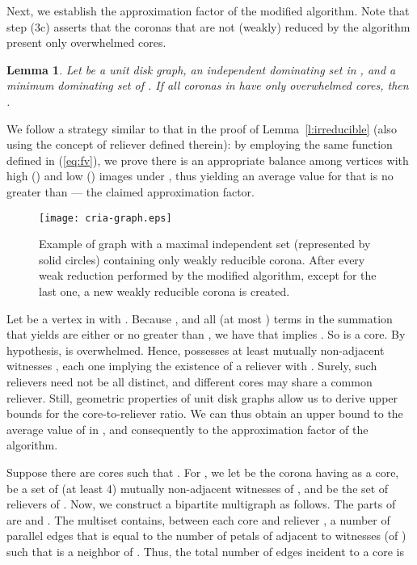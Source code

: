 \documentclass[preprint,12pt]{elsarticle}
\newtheorem{lem}[thm]{Lemma}
\begin{document}
Next, we establish the approximation factor of the modified algorithm. Note that step (3c) asserts that the coronas that are not (weakly) reduced by the algorithm present only overwhelmed cores.

\begin{lem} \label{l:irreducible_partial}
Let  be a unit disk graph,  an independent dominating set in , and  a minimum dominating set of . If all coronas \linebreak in  have only overwhelmed cores, then .
\end{lem}

\begin{pf}
We follow a strategy similar to that in the proof of Lemma~\ref{l:irreducible} (also using the concept of reliever defined therein): by employing the same function
  defined in (\ref{eq:fv}),
we prove there is an appropriate balance among vertices
with high () and low () images under , thus yielding an average value for  that is no greater than  --- the claimed approximation factor.

\begin{figure}
 \centering
 \texttt{[image: cria-graph.eps]}
 \caption{\label{f:newcoronas}Example of graph with a maximal independent set (represented by solid circles) containing only  weakly reducible corona. After every weak reduction performed by the modified algorithm, except for the last one, a new weakly reducible corona is created.}
\end{figure}

Let  be a vertex in  with . Because , and all (at most ) terms in the summation that yields  are either  or no greater than , we have that  implies . So  is a core.
By hypothesis,  is overwhelmed. Hence,  possesses at least  mutually non-adjacent witnesses , each one implying the existence of a reliever  with . Surely, such relievers need not be all distinct, and different cores may share a common reliever.
Still, geometric properties of unit disk graphs allow us to derive upper bounds for the core-to-reliever ratio. We can thus obtain an upper bound to the average value of  in , and consequently to the approximation factor of the algorithm.

Suppose there are  cores  such that . For , we let  be the corona having  as a core,  be a set of (at least 4) mutually non-adjacent witnesses of , and  be the set of relievers of . Now, we construct a bipartite multigraph  as follows. The parts of  are  and . The multiset  contains, between each core  and reliever , a number  of parallel edges that is equal to the number of petals of  adjacent to witnesses  \linebreak (of ) such that  is a neighbor of .
Thus, the total number of edges incident to a core  is




\end{pf}
\end{document}
